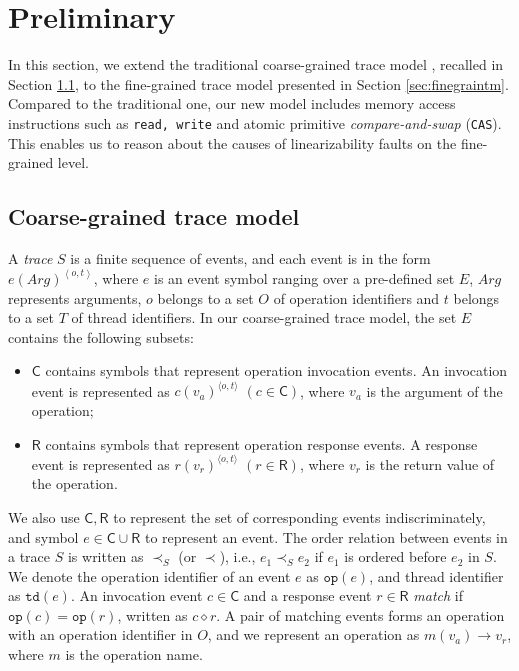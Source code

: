\documentclass[runningheads]{llncs}
\newcommand{\ecall}{\mathsf{C}}
\newcommand{\eresp}{\mathsf{R}}
\begin{document}
\section{Preliminary}\label{sec:fgtracemodel}


In this section, we extend the traditional coarse-grained trace model \cite{DBLP:conf/popl/BouajjaniEEH15}, recalled in Section \ref{sec:coarsegraintm}, to the fine-grained trace model presented in Section \ref{sec:finegraintm}. Compared to the traditional one, our new model includes memory access instructions such as \texttt{read, write} and atomic primitive \textit{compare-and-swap} (\texttt{CAS}). This enables us to reason about the causes of linearizability faults on the fine-grained level.

\subsection{Coarse-grained trace model}\label{sec:coarsegraintm}
A \textit{trace} $S$ is a finite sequence of events, and each event is in the form $e(\mathit{Arg})^{\left\langle o,t\right\rangle}$, where $e$ is an event symbol ranging over a pre-defined set $E$, $\mathit{Arg}$ represents arguments, $o$ belongs to a set $O$ of operation identifiers and $t$ belongs to a set $T$ of thread identifiers. In our coarse-grained trace model, the set $E$ contains the following subsets:
\begin{itemize}
  \item $\ecall$ contains symbols that represent operation invocation events. An invocation event is represented as $c(v_a)^{\langle o,t\rangle}$ $(c\in \ecall)$, where $v_a$ is the argument of the operation;
  \item $\eresp$ contains symbols that represent operation response events. A response event is represented as $r(v_r)^{\langle o,t\rangle}$ $(r\in \eresp)$, where $v_r$ is the return value of the operation.
\end{itemize}
\noindent We also use $\ecall, \eresp$ to represent the set of corresponding events indiscriminately, and symbol $e\in \ecall\cup \eresp$ to represent an event. The order relation between events in a trace $S$ is written as $\prec_S$ (or $\prec$), i.e., $e_1\prec_S e_2$ if $e_1$ is ordered before $e_2$ in $S$. We denote the operation identifier of an event $e$ as $\mathtt{op}(e)$, and thread identifier as $\mathtt{td}(e)$. An invocation event $c\in \ecall$ and a response event $r\in \eresp$ \textit{match} if $\mathtt{op}(c) = \mathtt{op}(r)$, written as $c\diamond r$. A pair of matching events forms an operation with an operation identifier in $O$, and we represent an operation as $m(v_a)\to v_r$, where $m$ is the operation name.
\end{document}
